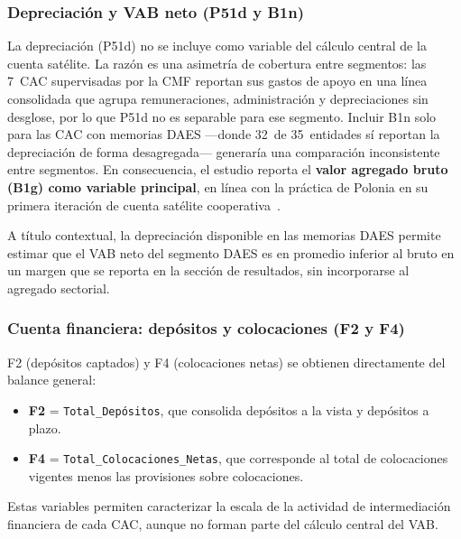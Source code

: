 \subsubsection*{Depreciación y VAB neto (P51d y B1n)}

La depreciación (P51d) no se incluye como variable del
cálculo central de la cuenta satélite. La razón es una
asimetría de cobertura entre segmentos: las 7~CAC
supervisadas por la CMF reportan sus gastos de apoyo en
una línea consolidada que agrupa remuneraciones,
administración y depreciaciones sin desglose, por lo que
P51d no es separable para ese segmento. Incluir B1n solo
para las CAC con memorias DAES ---donde 32~de 35~entidades
sí reportan la depreciación de forma desagregada--- generaría
una comparación inconsistente entre segmentos. En
consecuencia, el estudio reporta el \textbf{valor agregado
bruto (B1g) como variable principal}, en línea con la
práctica de Polonia en su primera iteración de cuenta
satélite cooperativa~\cite{statistics_poland_social_2021}.

A título contextual, la depreciación disponible en las
memorias DAES permite estimar que el VAB neto del segmento
DAES es en promedio inferior al bruto en un margen que se
reporta en la sección de resultados, sin incorporarse al
agregado sectorial.

\subsubsection*{Cuenta financiera: depósitos y colocaciones
(F2 y F4)}

F2 (depósitos captados) y F4 (colocaciones netas) se
obtienen directamente del balance general:

\begin{itemize}
  \item \textbf{F2} = \texttt{Total\_Depósitos}, que
  consolida depósitos a la vista y depósitos a plazo.
  \item \textbf{F4} = \texttt{Total\_Colocaciones\_Netas},
  que corresponde al total de colocaciones vigentes menos
  las provisiones sobre colocaciones.
\end{itemize}

Estas variables permiten caracterizar la escala de la
actividad de intermediación financiera de cada CAC, aunque
no forman parte del cálculo central del VAB.

